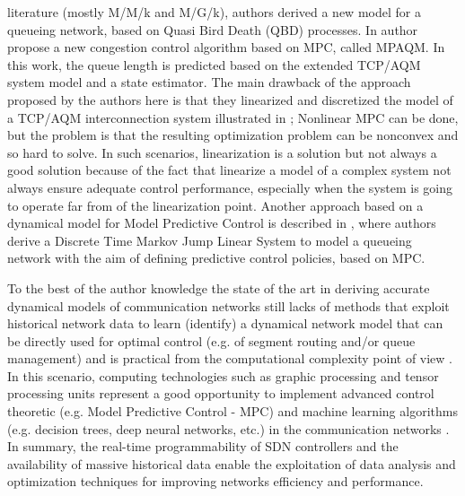 literature (mostly M/M/k and M/G/k), authors derived a new model for a queueing network, based on Quasi Bird Death (QBD) processes. In \cite{WANG2012120} author propose a new congestion control algorithm based on MPC, called MPAQM. In this work, the queue length is predicted based on the extended TCP/AQM system model and a state estimator. The main drawback of the approach proposed by the authors here is that they linearized and discretized the model of a TCP/AQM interconnection system illustrated in \cite{TCPSTATESPACE}; Nonlinear MPC can be done, but the problem is that the resulting optimization problem can be nonconvex and so hard to solve. In such scenarios, linearization is a solution but not always a good solution because of the fact that linearize a model of a complex system not always ensure adequate control performance, especially when the system is going to operate far from of the linearization point. Another approach based on a dynamical model for Model Predictive Control is described in \cite{SchoffMPC}, where authors derive a Discrete Time Markov Jump Linear System to model a queueing network with the aim of defining predictive control policies, based on MPC.

To the best of the author knowledge the state of the art in deriving accurate dynamical models of communication networks still lacks of methods that exploit historical network data to learn (identify) a dynamical network model that can be directly used for optimal control (e.g. of segment routing and/or queue management) and is practical from the computational complexity point of view \cite{Neely2010,Lemeshko2019,Kim2019,Aljoby2019,Lebedenko2018,Le2007,SouravGhosh2005}. In this scenario, computing technologies such as graphic processing and tensor processing units represent a good opportunity to implement advanced control theoretic (e.g. Model Predictive Control - MPC) and machine learning algorithms (e.g. decision trees, deep neural networks, etc.) in the communication networks \cite{Wang2018, Usama2017, Xie2019, Xu2018}. In summary, the real-time programmability of SDN controllers and the availability of massive historical data enable the exploitation of data analysis and optimization techniques for improving networks efficiency and performance.

